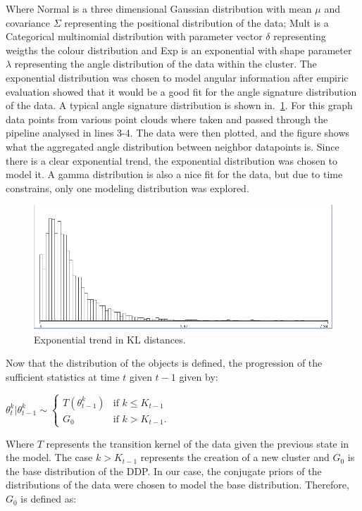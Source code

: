 \documentclass[twoside,hidelinks]{article}
\begin{document}
Where Normal is a three dimensional Gaussian distribution with mean $\mu$ and covariance $\Sigma$ representing the positional distribution of the data; Mult is a Categorical multinomial distribution with parameter vector $\delta$ representing weigths the colour distribution and Exp is an exponential with shape parameter $\lambda$ representing the angle distribution of the data within the cluster. The exponential distribution was chosen to model angular information after empiric evaluation showed that it would be a good fit for the angle signature distribution of the data. A typical angle signature distribution is shown in.~\ref{pcl:kl}. For this graph data points from various point clouds where taken and passed through the pipeline analysed in lines 3-4. The data were then plotted, and the figure shows what the aggregated angle distribution between neighbor datapoints is. Since there is a clear exponential trend, the exponential distribution was chosen to model it. A gamma distribution is also a nice fit for the data, but due to time constrains, only one modeling    distribution was explored.

\begin{figure}[h!]
  \centering
    \includegraphics[width=.5\textwidth]{Kullback-Leibler}
    \caption{Exponential trend in KL distances.}
  \label{pcl:kl}
\end{figure}


Now that the distribution of the objects is defined, the progression of the sufficient statistics at time $t$ given $t-1$ given by:

$\theta_t^k | \theta_{t-1}^k \sim
\begin{cases} T (\theta_{t-1}^k) &\mbox{if } k \leq K_{t-1} \\
G_0 & \mbox{if } k > K_{t-1}. \end{cases}$

Where $T$ represents the transition kernel of the data given the previous state in the model. The case $ k > K_{t-1} $ represents the creation of a new cluster and $G_0$ is the base distribution of the DDP. In our case, the conjugate priors of the distributions of the data were chosen to model the base distribution. Therefore, $G_0$ is defined as:
\end{document}
